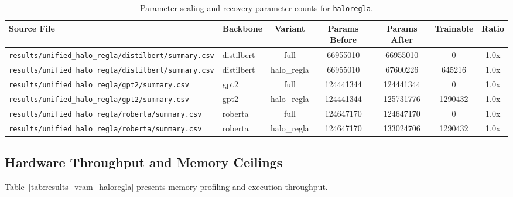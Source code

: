 \begin{table}[t]
\centering
\small
\begin{tabular}{llccccc}
\toprule
\textbf{Source File} & \textbf{Backbone} & \textbf{Variant} & \textbf{Params Before} & \textbf{Params After} & \textbf{Trainable} & \textbf{Ratio} \\
\midrule
\texttt{results/unified\_halo\_regla/distilbert/summary.csv} & distilbert & full & 66955010 & 66955010 & 0 & 1.0x \\
\texttt{results/unified\_halo\_regla/distilbert/summary.csv} & distilbert & halo\_regla & 66955010 & 67600226 & 645216 & 1.0x \\
\texttt{results/unified\_halo\_regla/gpt2/summary.csv} & gpt2 & full & 124441344 & 124441344 & 0 & 1.0x \\
\texttt{results/unified\_halo\_regla/gpt2/summary.csv} & gpt2 & halo\_regla & 124441344 & 125731776 & 1290432 & 1.0x \\
\texttt{results/unified\_halo\_regla/roberta/summary.csv} & roberta & full & 124647170 & 124647170 & 0 & 1.0x \\
\texttt{results/unified\_halo\_regla/roberta/summary.csv} & roberta & halo\_regla & 124647170 & 133024706 & 1290432 & 1.0x \\
\bottomrule
\end{tabular}
\caption{Parameter scaling and recovery parameter counts for \texttt{haloregla}.}
\label{tab:results_params_haloregla}
\end{table}

\subsection{Hardware Throughput and Memory Ceilings}
Table~\ref{tab:results_vram_haloregla} presents memory profiling and execution throughput.

